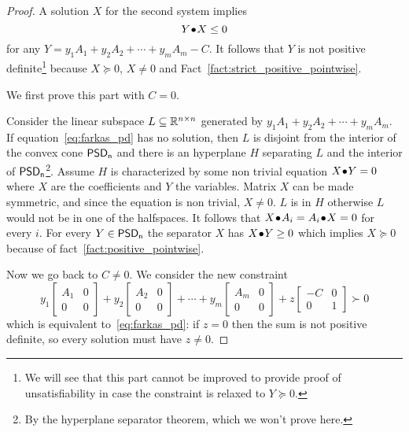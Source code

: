\documentclass[a4paper,twoside,justified]{tufte-handout}
\begin{document}
\begin{proof}

   A solution $X$ for the second system
  implies
  \begin{equation}
    \pointwiseprod{Y}{X}
    \leq 0
  \end{equation}
  for any $ Y=y_{1}A_{1}+y_{2}A_{2} + \cdots + y_{m}A_{m}-C $. It
  follows that $ Y $ is not positive definite\footnote{We will see
    that this part cannot be improved to provide proof of
    unsatisfiability in case the constraint is relaxed to $ Y\succeq 0
    $.} because $ X\succeq 0 $, $ X\not=0 $ and Fact~\ref{fact:strict_positive_pointwise}.

   We first prove this part with $ C=0 $.

  Consider the linear subspace $ L\subseteq\RR^{n \times n} $
  generated by $y_{1}A_{1}+y_{2}A_{2} + \cdots + y_{m}A_{m}$.
  If equation~\eqref{eq:farkas_pd} has no solution, then $ L $ is
  disjoint from the interior of the convex cone $
  \positivesemidefinite[n] $ and there is an hyperplane $ H $
  separating $ L $ and the interior of
  $\positivesemidefinite[n]$\footnote{By the hyperplane separator
    theorem, which we won't prove here.}.
  Assume $H$ is characterized by some non trivial equation $
  \pointwiseprod{X}{Y}=0$ where $ X $ are the coefficients and $ Y $
  the variables. Matrix $ X $ can be made symmetric, and since the
  equation is non trivial, $ X\not=0 $.
  $ L $ is in $H$ otherwise $ L $ would not be in one of the
  halfspaces. It follows that $ \pointwiseprod{X}{A_{i}}=
  \pointwiseprod{A_{i}}{X}=0 $ for every $ i $.
  For every $ Y\in\positivesemidefinite[n] $ the separator $ X $ has $
  \pointwiseprod{X}{Y}\geq 0 $ which implies $ X \succeq 0 $
  because of fact~\ref{fact:positive_pointwise}.  
 
  Now we go back to $ C\not=0$. We consider the new constraint
  \begin{equation}
    y_{1}\begin{bmatrix}A_{1} & 0\\ 0 & 0\end{bmatrix}
    +y_{2}\begin{bmatrix}A_{2} & 0\\ 0 & 0\end{bmatrix} + \cdots
    +y_{m}\begin{bmatrix}A_{m} & 0\\ 0 & 0\end{bmatrix} 
    + z \begin{bmatrix} -C & 0\\ 0 & 1\end{bmatrix} \succ 0
  \end{equation}
  which is equivalent to~\eqref{eq:farkas_pd}: if $ z=0 $ then the sum
  is not positive definite, so every solution must have $ z\not=0 $.


\end{proof}
\end{document}
